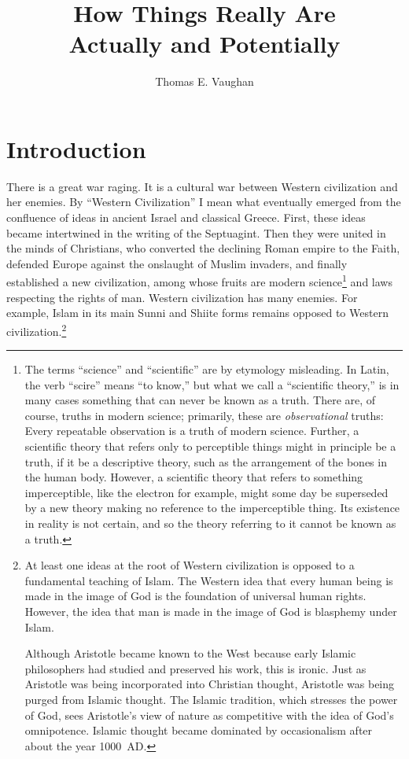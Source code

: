 \documentclass{article}
\title{How Things Really Are\\{\Large Actually and Potentially}}
\author{Thomas E. Vaughan}
\begin{document}
\maketitle

\section{Introduction}

There is a great war raging.  It is a cultural war between Western civilization
and her enemies.  By ``Western Civilization'' I mean what eventually emerged
from the confluence of ideas in ancient Israel and classical Greece.  First,
these ideas became intertwined in the writing of the Septuagint.  Then they
were united in the minds of Christians, who converted the declining Roman
empire to the Faith, defended Europe against the onslaught of Muslim invaders,
and finally established a new civilization, among whose fruits are modern
science\footnote{%
   The terms ``science'' and ``scientific'' are by etymology misleading.  In
   Latin, the verb ``scire'' means ``to know,'' but what we call a ``scientific
   theory,'' is in many cases something that can never be known as a truth.
   There are, of course, truths in modern science; primarily, these are
   \emph{observational} truths: Every repeatable observation is a truth of
   modern science.  Further, a scientific theory that refers only to
   perceptible things might in principle be a truth, if it be a descriptive
   theory, such as the arrangement of the bones in the human body.  However, a
   scientific theory that refers to something imperceptible, like the electron
   for example, might some day be superseded by a new theory making no
   reference to the imperceptible thing.  Its existence in reality is not
   certain, and so the theory referring to it cannot be known as a truth.%
}
and laws respecting the rights of man.  Western civilization has many enemies.
For example, Islam in its main Sunni and Shiite forms remains opposed to
Western civilization.\footnote{%
   At least one ideas at the root of Western civilization is opposed to a
   fundamental teaching of Islam.  The Western idea that every human being is
   made in the image of God is the foundation of universal human rights.
   However, the idea that man is made in the image of God is blasphemy under
   Islam.
   
   Although Aristotle became known to the West because early Islamic
   philosophers had studied and preserved his work, this is ironic.  Just as
   Aristotle was being incorporated into Christian thought, Aristotle was being
   purged from Islamic thought. The Islamic tradition, which stresses the power
   of God, sees Aristotle's view of nature as competitive with the idea of
   God's omnipotence.  Islamic thought became dominated by occasionalism after
   about the year 1000~AD.
}
\end{document}
